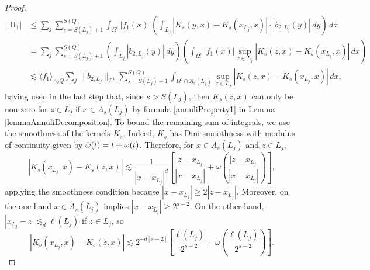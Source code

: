 \documentclass[12pt]{amsart}
\newcommand{\R}{\mathbb{R}}
\newcommand{\one}{\mathds{1}}
\theoremstyle{plain}
\theoremstyle{definition} %
\numberwithin{equation}{section}
\begin{document}
\begin{proof}
\begin{align}
        \nonumber|\mathrm{II}_1|
        &\leq 
        \sum_j\sum_{s=S(L_j)+1}^{S(Q)}\int_{\Omega^c}|f_1(x)|\left(\int_{L_j}|K_s(y,x)-K_s(x_{L_j},x)|\cdot |b_{2,L_j}(y)|\, dy\right)\, dx
        \\\nonumber &=%
        \sum_j\sum_{s=S(L_j)+1}^{S(Q)}\left(\int_{L_j}|b_{2,L_j}(y)|\, dy\right)\left(\int_{\Omega^{c}}|f_1(x)|\sup_{z\in L_j}|K_s(z,x)-K_s(x_{L_j},x)|\, dx\right)
        \\&\lesssim %
        \langle f_1\rangle_{\Lambda_dQ}
        \sum_j \|b_{2,L_j}\|_{L^1}\sum_{s=S(L_j)+1}^{S(Q)}\int_{\Omega^c\cap A_{s}(L_j)}\sup_{z\in L_j}|K_s(z,x)-K_s(x_{L_j},x)|\, dx,
        \end{align}
having used in the last step that, since $s>S(L_j)$, then $K_s(z,x)$ can only be non-zero for $z\in L_j$ if $x\in A_{s}(L_j)$ by formula \eqref{annuliProperty1} in Lemma \ref{lemmaAnnuliDecomposition}. To bound the remaining sum of integrals, we use the smoothness of the kernels $K_s$. Indeed, $K_s$ has Dini smoothness with modulus of continuity given by $\Tilde{\omega}(t)=t+\omega(t)$. Therefore, for $x\in A_s(L_j)$ and $z\in L_j$,
    \begin{equation}\label{chekingSmoothnessLemma}
    |K_s(x_{L_j},x)-K_s(z,x)|
    \lesssim 
    \frac{1}{|x-x_{L_j}|^d}
    \left[
    \frac{|z-x_{L_j|}}{|x-x_{L_j}|}+\omega\left(\frac{|z-x_{L_j|}}{|x-x_{L_j}|}\right)
    \right],
    \end{equation}
applying the smoothness condition because $|x-x_{L_j}|\geq 2|z-x_{L_j}| $. Moreover, on the one hand $x\in A_s(L_j)$ implies $|x-x_{L_j}|\geq 2^{s-2}$. On the other hand, $|x_{L_j}-z| \lesssim_d \ell(L_j)$ if $z \in L_j$, so 
    \begin{equation}\label{smoothnessLj}
    |K_s(x_{L_j},x)-K_s(z,x)|
    \lesssim 
    2^{-d[s-2]}
    \left[\frac{\ell(L_j)}{2^{s-2}}+\omega\left(\frac{\ell(L_j)}{2^{s-2}}\right)\right].
    \end{equation}

\end{proof}
\end{document}

